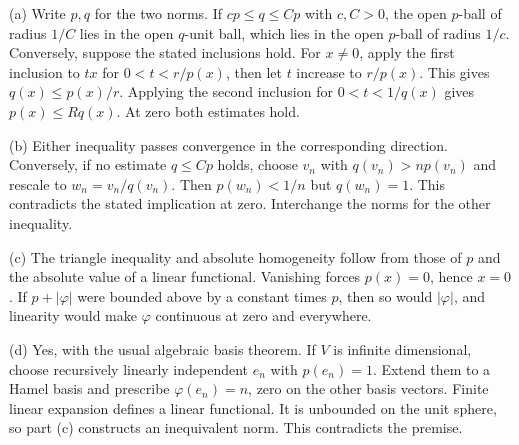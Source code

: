 (a) Write $p,q$ for the two norms. If $c p\le q\le C p$ with $c,C>0$, the open $p$-ball of radius $1/C$ lies in the open $q$-unit ball, which lies in the open $p$-ball of radius $1/c$. Conversely, suppose the stated inclusions hold. For $x\ne0$, apply the first inclusion to $tx$ for $0<t<r/p(x)$, then let $t$ increase to $r/p(x)$. This gives $q(x)\le p(x)/r$. Applying the second inclusion for $0<t<1/q(x)$ gives $p(x)\le Rq(x)$. At zero both estimates hold.

(b) Either inequality passes convergence in the corresponding direction. Conversely, if no estimate $q\le C p$ holds, choose $v_n$ with $q(v_n)>n p(v_n)$ and rescale to $w_n=v_n/q(v_n)$. Then $p(w_n)<1/n$ but $q(w_n)=1$. This contradicts the stated implication at zero. Interchange the norms for the other inequality.

(c) The triangle inequality and absolute homogeneity follow from those of $p$ and the absolute value of a linear functional. Vanishing forces $p(x)=0$, hence $x=0$. If $p+|\varphi|$ were bounded above by a constant times $p$, then so would $|\varphi|$, and linearity would make $\varphi$ continuous at zero and everywhere.

(d) Yes, with the usual algebraic basis theorem. If $V$ is infinite dimensional, choose recursively linearly independent $e_n$ with $p(e_n)=1$. Extend them to a Hamel basis and prescribe $\varphi(e_n)=n$, zero on the other basis vectors. Finite linear expansion defines a linear functional. It is unbounded on the unit sphere, so part (c) constructs an inequivalent norm. This contradicts the premise.
